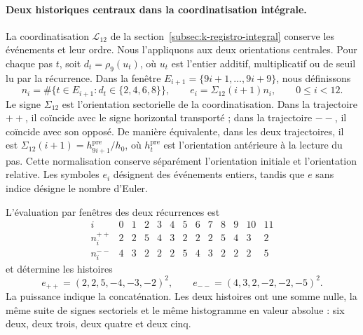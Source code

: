 \paragraph{Deux historiques centraux dans la coordinatisation intégrale.}
La coordinatisation \(\mathcal L_{12}\) de la
section~\ref{subsec:k-registro-integral} conserve les événements et leur
ordre. Nous l'appliquons aux deux orientations centrales. Pour chaque
pas \(t\), soit \(d_t=\rho_9(u_t)\), où \(u_t\) est l'entier
additif, multiplicatif ou de seuil lu par la récurrence.
Dans la fenêtre \(E_{i+1}=\{9i+1,\ldots,9i+9\}\), nous définissons
\[
 n_i=\#\{t\in E_{i+1}:d_t\in\{2,4,6,8\}\},\qquad
 e_i=\Sigma_{12}(i+1)n_i,\qquad0\le i<12.
\]
Le signe \(\Sigma_{12}\) est l'orientation sectorielle de la coordinatisation.
Dans la trajectoire \({++}\), il coïncide avec le signe horizontal
transporté ; dans la trajectoire \({--}\), il coïncide avec son opposé.
De manière équivalente, dans les deux trajectoires, il est
\(\Sigma_{12}(i+1)=h^{\mathrm{pre}}_{9i+1}/h_0\), où
\(h^{\mathrm{pre}}_t\) est l'orientation antérieure à la lecture du pas.
Cette normalisation conserve séparément l'orientation initiale et
l'orientation relative. Les symboles \(e_i\) désignent des événements
entiers, tandis que \(e\) sans indice désigne le nombre d'Euler.

L'évaluation par fenêtres des deux récurrences est
\[
\begin{array}{c|rrrrrrrrrrrr}
i&0&1&2&3&4&5&6&7&8&9&10&11\\\hline
n_i^{++}&2&2&5&4&3&2&2&2&5&4&3&2\\
n_i^{--}&4&3&2&2&2&5&4&3&2&2&2&5
\end{array}
\]
et détermine les histoires
\begin{equation}
 e_{++}=(2,2,5,-4,-3,-2)^2,\qquad
 e_{--}=(4,3,2,-2,-2,-5)^2.
 \label{eq:el-historias-centrales}
\end{equation}
La puissance indique la concaténation. Les deux histoires ont une somme nulle,
la même suite de signes sectoriels et le même histogramme
en valeur absolue : six deux, deux trois, deux quatre et deux cinq.

